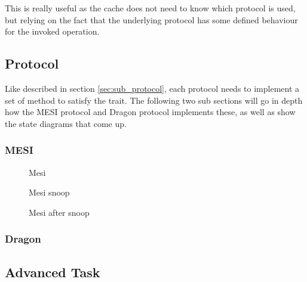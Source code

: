 This is really useful as the cache does not need to know which protocol is used, but relying on the fact that the underlying protocol has some defined behaviour for the invoked operation.


\subsection{Protocol}
Like described in section \ref{sec:sub_protocol}, each protocol needs to implement a set of method to satisfy the trait.
The following two sub sections will go in depth how the MESI protocol and Dragon protocol implements these, as well as show the state diagrams that come up.

\subsubsection{MESI}

\begin{figure}[ht]
    \centering
    \caption{Mesi}
    \label{fig:mesi}
\end{figure}

\begin{figure}[ht]
    \centering
    \caption{Mesi snoop}
    \label{fig:mesi_snoop}
\end{figure}

\begin{figure}[ht]
    \centering
    \caption{Mesi after snoop}
    \label{fig:mesi_after_snoop}
\end{figure}

\subsubsection{Dragon}

\subsection{Advanced Task}
